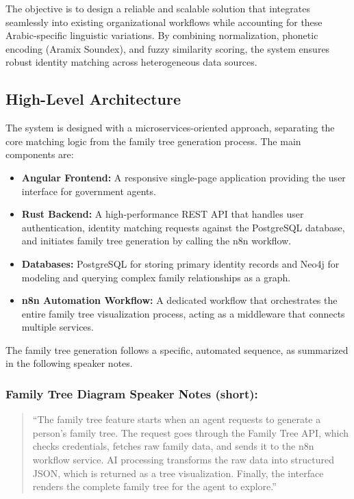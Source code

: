 The objective is to design a reliable and scalable solution that integrates seamlessly into existing organizational workflows while accounting for these Arabic-specific linguistic variations. By combining normalization, phonetic encoding (Aramix Soundex), and fuzzy similarity scoring, the system ensures robust identity matching across heterogeneous data sources.

\subsection{High-Level Architecture}
The system is designed with a microservices-oriented approach, separating the core matching logic from the family tree generation process. The main components are:
\begin{itemize}
    \item \textbf{Angular Frontend:} A responsive single-page application providing the user interface for government agents.
    \item \textbf{Rust Backend:} A high-performance REST API that handles user authentication, identity matching requests against the PostgreSQL database, and initiates family tree generation by calling the n8n workflow.
    \item \textbf{Databases:} PostgreSQL for storing primary identity records and Neo4j for modeling and querying complex family relationships as a graph.
    \item \textbf{n8n Automation Workflow:} A dedicated workflow that orchestrates the entire family tree visualization process, acting as a middleware that connects multiple services.
\end{itemize}

The family tree generation follows a specific, automated sequence, as summarized in the following speaker notes.

\subsubsection*{Family Tree Diagram Speaker Notes (short):}
\begin{quote}
“The family tree feature starts when an agent requests to generate a person’s family tree. The request goes through the Family Tree API, which checks credentials, fetches raw family data, and sends it to the n8n workflow service. AI processing transforms the raw data into structured JSON, which is returned as a tree visualization. Finally, the interface renders the complete family tree for the agent to explore.”
\end{quote}

